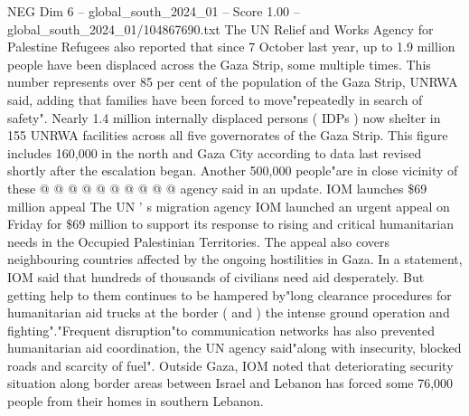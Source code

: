 \begin{textsample}{NEG Dim 6 – global\_south\_2024\_01 – Score 1.00 – global\_south\_2024\_01/104867690.txt}
The UN Relief and Works Agency for Palestine Refugees also reported that since 7 October last year, up to 1.9 million people have been displaced across the Gaza Strip, some multiple times.
This number represents over 85 per cent of the population of the Gaza Strip, UNRWA said, adding that families have been forced to move"repeatedly in search of safety".
Nearly 1.4 million internally displaced persons ( IDPs ) now shelter in 155 UNRWA facilities across all five governorates of the Gaza Strip.
This figure includes 160,000 in the north and Gaza City according to data last revised shortly after the escalation began.
Another 500,000 people"are in close vicinity of these @ @ @ @ @ @ @ @ @ @ agency said in an update.
IOM launches \$69 million appeal The UN ' s migration agency IOM launched an urgent appeal on Friday for \$69 million to support its response to rising and critical humanitarian needs in the Occupied Palestinian Territories.
The appeal also covers neighbouring countries affected by the ongoing hostilities in Gaza.
In a statement, IOM said that hundreds of thousands of civilians need aid desperately.
But getting help to them continues to be hampered by"long clearance procedures for humanitarian aid trucks at the border ( and ) the intense ground operation and fighting"."Frequent disruption"to communication networks has also prevented humanitarian aid coordination, the UN agency said"along with insecurity, blocked roads and scarcity of fuel".
Outside Gaza, IOM noted that deteriorating security situation along border areas between Israel and Lebanon has forced some 76,000 people from their homes in southern Lebanon.

\end{textsample}
